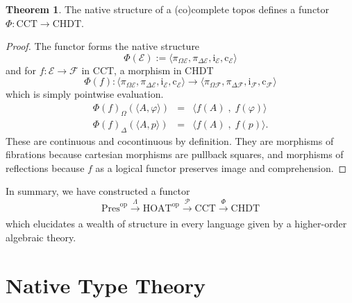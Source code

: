 \documentclass[12pt]{article}
\theoremstyle{definition}
\newtheorem{theorem}{Theorem}
\newcommand{\msc}[1]{\mathscr{#1}}
\newcommand{\mrm}[1]{\mathrm{#1}}
\newcommand{\xr}[2]{\xrightarrow[#2]{#1}}
\newcommand{\op}{\mrm{op}}
\newcommand{\HOAT}{\mrm{HOAT}}
\newcommand{\pow}{\msc{P}}
\begin{document}
\begin{theorem}
    The native structure of a (co)complete topos defines a functor $\Phi:\mrm{CCT}\to \mrm{CHDT}$.
\end{theorem}
\begin{proof}
    The functor forms the native structure
    \[\Phi(\msc{E}) := \langle \pi_{\Omega\msc{E}}, \pi_{\Delta\msc{E}}, \mrm{i}_\msc{E}, \mrm{c}_\msc{E}\rangle\]
    and for $f:\msc{E}\to \msc{F}$ in $\mrm{CCT}$, a morphism in CHDT
    \[\Phi(f): \langle \pi_{\Omega\msc{E}}, \pi_{\Delta\msc{E}}, \mrm{i}_{\msc{E}}, \mrm{c}_{\msc{E}}\rangle\to \langle \pi_{\Omega\msc{F}}, \pi_{\Delta\msc{F}}, \mrm{i}_{\msc{F}}, \mrm{c}_{\msc{F}}\rangle  \]
    which is simply pointwise evaluation.
    \[\begin{array}{lcl}
        \Phi(f)_\Omega(\langle A,\varphi\rangle) & = & \langle f(A) \;,\; f(\varphi)\rangle\\
        \Phi(f)_\Delta(\langle A,p\rangle) & = & \langle f(A) \;,\; f(p)\rangle.
    \end{array}\]
    These are continuous and cocontinuous by definition. They are morphisms of fibrations because cartesian morphisms are pullback squares, and morphisms of reflections because $f$ as a logical functor preserves image and comprehension.
\end{proof}

In summary, we have constructed a functor
\[\mrm{Pres}^\op \xr{\Lambda}{} \HOAT^\op\xr{\pow}{} \mrm{CCT} \xr{\Phi}{} \mrm{CHDT}\]
which elucidates a wealth of structure in every language given by a higher-order algebraic theory.



\section{Native Type Theory}
\label{sec:typeth}
\end{document}
